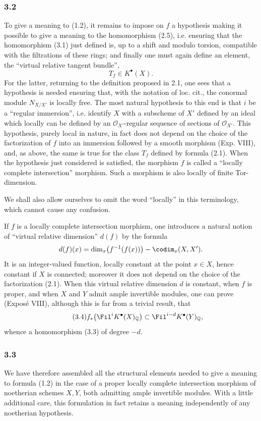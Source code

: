 \subsubsection*{3.2}
To give a meaning to (1.2), it remains to impose on $f$ a hypothesis making it possible to give a meaning to the homomorphism (2.5), i.e. ensuring that the homomorphism (3.1) just defined is, up to a shift and modulo torsion, compatible with the filtrations of these rings; and finally one must again define an element, the ``virtual relative tangent bundle'',
\[
T_f\in K^\bullet(X).
\]
For the latter, returning to the definition proposed in 2.1, one sees that a hypothesis is needed ensuring that, with the notation of loc. cit., the conormal module $N_{X/X'}$ is locally free. The most natural hypothesis to this end is that $i$ be a ``regular immersion'', i.e. identify $X$ with a subscheme of $X'$ defined by an ideal which locally can be defined by an $\mathcal O_{X'}$-regular sequence of sections of $\mathcal O_{X'}$. This hypothesis, purely local in nature, in fact does not depend on the choice of the factorization of $f$ into an immersion followed by a smooth morphism (Exp. VIII), and, as above, the same is true for the class $T_f$ defined by formula (2.1). When the hypothesis just considered is satisfied, the morphism $f$ is called a ``locally complete intersection'' morphism. Such a morphism is also locally of finite Tor-dimension.

We shall also allow ourselves to omit the word ``locally'' in this terminology, which cannot cause any confusion.

If $f$ is a locally complete intersection morphism, one introduces a natural notion of ``virtual relative dimension'' $d(f)$ by the formula
\[
d(f)(x)=\dim_x\bigl(f^{-1}(f(x))\bigr)-\codim_x(X,X').
\]
It is an integer-valued function, locally constant at the point $x\in X$, hence constant if $X$ is connected; moreover it does not depend on the choice of the factorization (2.1). When this virtual relative dimension $d$ is constant, when $f$ is proper, and when $X$ and $Y$ admit ample invertible modules, one can prove (Expos\'e VIII), although this is far from a trivial result, that
\begin{equation}\tag{3.4}
f_*\bigl(\Fil^i K^\bullet(X)_{\mathbb Q}\bigr)\subset \Fil^{i-d}K^\bullet(Y)_{\mathbb Q},
\end{equation}
whence a homomorphism (3.3) of degree $-d$.

\subsubsection*{3.3}
We have therefore assembled all the structural elements needed to give a meaning to formula (1.2) in the case of a proper locally complete intersection morphism of noetherian schemes $X,Y$, both admitting ample invertible modules. With a little additional care, this formulation in fact retains a meaning independently of any noetherian hypothesis.

